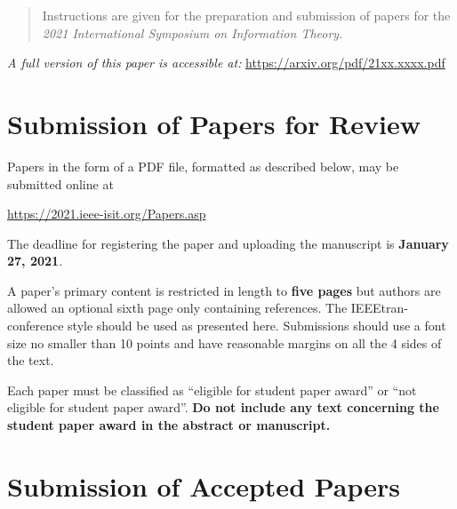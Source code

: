 \documentclass[conference,letterpaper]{IEEEtran}
\begin{document}
\maketitle

\begin{abstract}
   Instructions
  are given for the preparation and submission of papers for the
  \emph{2021 International Symposium on Information Theory}.
\end{abstract}


\textit{A full version of this paper is accessible at:}
\url{https://arxiv.org/pdf/21xx.xxxx.pdf} 

\section{Submission of Papers for Review}

Papers in the form of a PDF file, formatted as described below, may be
submitted online at
\begin{center}
  \url{https://2021.ieee-isit.org/Papers.asp}
\end{center}
The deadline for registering the paper and uploading the manuscript is \textbf{January 27, 2021}.

A paper's primary content is restricted in length to \textbf{five pages} but
authors are allowed an optional sixth page only containing references.
The IEEEtran-conference style should be used as presented here.
Submissions should use a font size no smaller than 10 points and have reasonable margins on all the 4 sides of the text.

Each paper must be classified as ``eligible for student paper award''
or ``not eligible for student paper award''. \textbf{Do not include any text concerning the student paper award in the abstract or manuscript.}


\section{Submission of Accepted Papers}
\end{document}
